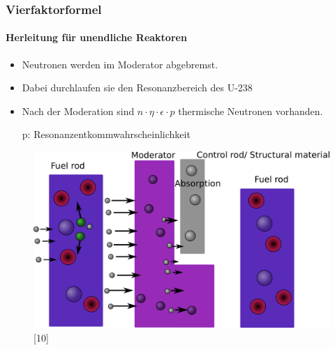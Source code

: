 \documentclass{beamer}[9pt]
\begin{document}
\begin{frame}
\frametitle{Vierfaktorformel}
\framesubtitle{Herleitung für unendliche Reaktoren}
\begin{itemize}
\item Neutronen werden im Moderator abgebremst.
\item Dabei durchlaufen sie den Resonanzbereich des U-238
\item Nach der Moderation sind $n\cdot\eta\cdot\epsilon\cdot p $  thermische
 Neutronen vorhanden.\\
 \item[p: ] Resonanzentkommwahrscheinlichkeit 
\end{itemize}

\begin{figure}
\centering
\includegraphics[scale=.15]{thermal_reactor_3.png}[10]
\end{figure}

\end{frame}
\end{document}
